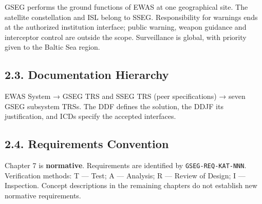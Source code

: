 GSEG performs the ground functions of EWAS at one geographical site. The satellite constellation and ISL belong to SSEG. Responsibility for warnings ends at the authorized institution interface; public warning, weapon guidance and interceptor control are outside the scope. Surveillance is global, with priority given to the Baltic Sea region.

\subsection{2.3. Documentation Hierarchy}\label{position-in-the-documentation-hierarchy}

EWAS System → GSEG TRS and SSEG TRS (peer specifications) → seven GSEG subsystem TRSs. The DDF defines the solution, the DDJF its justification, and ICDs specify the accepted interfaces.

\subsection{2.4. Requirements Convention}\label{requirements-convention}

Chapter 7 is \textbf{normative}. Requirements are identified by \texttt{GSEG-\allowbreak{}REQ-\allowbreak{}KAT-\allowbreak{}NNN}. Verification methods: T — Test; A — Analysis; R — Review of Design; I — Inspection. Concept descriptions in the remaining chapters do not establish new normative requirements.
